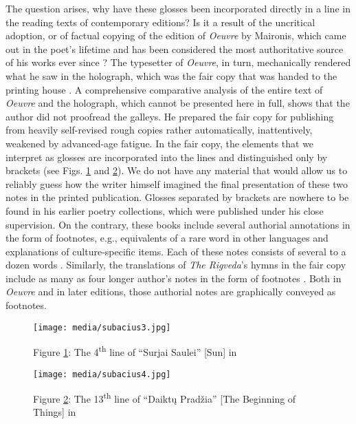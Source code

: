 \documentclass{article}
\begin{document}
The question arises, why have these glosses been incorporated directly in a line in the
reading texts of contemporary editions? Is it a
result of the uncritical adoption, or of factual copying of the edition of
\emph{Oeuvre} by Maironis, which came out in the poet's lifetime and has
been considered the most authoritative source of his works ever since \citep[182 and 187]{maironis_maironio_1927}? The typesetter of
\emph{Oeuvre}, in turn, mechanically rendered what he saw in the holograph, which was the
fair copy that was handed to the printing house \citep[227r and 233r]{maironis_vertimai_1927}. A comprehensive comparative analysis of the entire text of
\emph{Oeuvre} and the holograph, which cannot be presented here in full,
shows that the author did not proofread the galleys. He prepared the
fair copy for publishing from heavily self-revised rough copies rather
automatically, inattentively, weakened by advanced-age fatigue. In the
fair copy, the elements that we interpret as glosses are incorporated
into the lines and distinguished only by brackets (see Figs. \ref{fig:subacius3} and \ref{fig:subacius4}).
We do not have any material that would allow us to reliably guess how
the writer himself imagined the final presentation of these two notes in
the printed publication. Glosses separated by brackets are nowhere to be
found in his earlier poetry collections, which were published under his
close supervision. On the contrary, these books include several
authorial annotations in the form of footnotes, e.g., equivalents of a rare
word in other languages and explanations of culture-specific items. Each
of these notes consists of several to a dozen words \citep[30,
45--46, 56--58 and 109]{maironis_pavasario_1920}. Similarly, the translations of \emph{The
Rigveda}'s hymns in the fair copy include as many as four longer
author's notes in the form of footnotes \citep[228r, 231r
twice and 233r]{maironis_vertimai_1927}. Both in \emph{Oeuvre} and in later editions, those
authorial notes are graphically conveyed as footnotes.

\begin{figure}[H]
    \centering
    \texttt{[image: media/subacius3.jpg]}
    \caption{Figure \ref{fig:subacius3}: The 4\textsuperscript{th} line of ``Surjai Saulei'' [Sun] in \citealt[233r]{maironis_vertimai_1927}}
    \label{fig:subacius3}
\end{figure}

\begin{figure}[H]
    \centering
    \texttt{[image: media/subacius4.jpg]}
    \caption{Figure \ref{fig:subacius4}: The 13\textsuperscript{th} line of ``Daiktų Pradžia'' [The Beginning of Things] in \citealt[227r]{maironis_vertimai_1927}}
    \label{fig:subacius4}
\end{figure}
\end{document}
